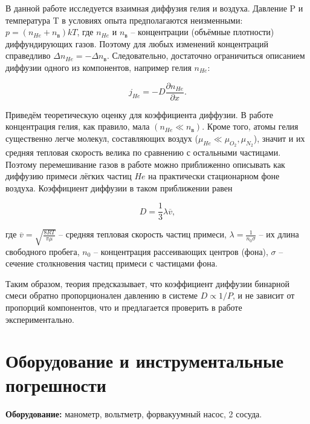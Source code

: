 \documentclass[
a4paper, %
12pt, %
]{article}
\begin{document}
	В данной работе исследуется взаимная диффузия гелия и воздуха. Давление P и температура T в условиях опыта предполагаются неизменными: $ p=(n_{He}+n_{\text{в}})kT $, где $ n_{He} $ и $ n_{\text{в}} $ -- концентрации (объёмные плотности) диффундирующих газов. Поэтому для любых изменений концентраций справедливо $ \Delta n_{He}=-\Delta n_{\text{в}} $. Следовательно, достаточно ограничиться описанием диффузии одного из компонентов, например гелия $ n_{He} $:
	
	\begin{equation}\label{1}
		j_{He}=-D\dfrac{\partial 	n_{He}}{\partial x}.
	\end{equation}
	
	Приведём теоретическую оценку для коэффициента диффузии. В работе концентрация гелия, как правило, мала $ (n_{He} \ll n_\text{в}) $. Кроме того, атомы гелия существенно легче молекул, составляющих воздух ($ \mu_{He} \ll \mu_{O_2}, \mu_{N_2} $), значит и их средняя тепловая скорость велика по сравнению с остальными частицами. Поэтому перемешивание газов в работе можно приближенно описывать как диффузию примеси лёгких частиц $ He $ на практически стационарном фоне воздуха. Коэффициент диффузии в таком приближении равен
	
	\begin{equation}\label{2}
		D=\dfrac{1}{3}\lambda 	\overline{v},
	\end{equation}
	
	где $ \overline{v}=\sqrt{\frac{8RT}{\pi \mu}} $ -- средняя тепловая скорость частиц примеси, $ \lambda = \frac{1}{n_0\sigma} $ -- их длина свободного пробега, $ n_0 $ -- концентрация рассеивающих центров (фона), $ \sigma $ -- сечение столкновения частиц примеси с частицами фона.
	
	Таким образом, теория предсказывает, что коэффициент диффузии бинарной смеси обратно пропорционален давлению в системе $ D \propto 1/P $, и не зависит от пропорций компонентов, что и предлагается проверить в работе экспериментально.
	
	\newpage
	
	\section{Оборудование и инструментальные погрешности}
	\textbf{Оборудование:} манометр, вольтметр, форвакуумный насос, 2 сосуда.
	
\end{document}
